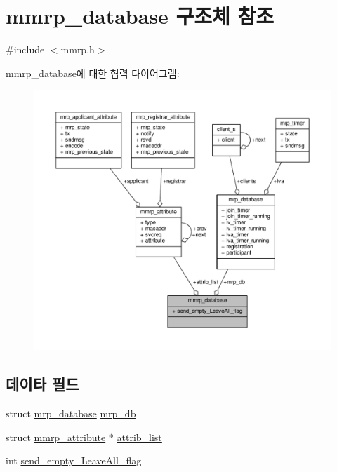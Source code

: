 \hypertarget{structmmrp__database}{}\section{mmrp\+\_\+database 구조체 참조}
\label{structmmrp__database}


{\ttfamily \#include $<$mmrp.\+h$>$}



mmrp\+\_\+database에 대한 협력 다이어그램\+:
\nopagebreak
\begin{figure}[H]
\begin{center}
\leavevmode
\includegraphics[width=350pt]{structmmrp__database__coll__graph}
\end{center}
\end{figure}
\subsection*{데이타 필드}
\begin{DoxyCompactItemize}
\item 
struct \hyperlink{structmrp__database}{mrp\+\_\+database} \hyperlink{structmmrp__database_a7e08db3b85c932325ce3a3605a09ab0c}{mrp\+\_\+db}
\item 
struct \hyperlink{structmmrp__attribute}{mmrp\+\_\+attribute} $\ast$ \hyperlink{structmmrp__database_aa65ffa246b17a8932ec564602195a338}{attrib\+\_\+list}
\item 
int \hyperlink{structmmrp__database_a5c551b6ff3976e96ec18e69b0706a532}{send\+\_\+empty\+\_\+\+Leave\+All\+\_\+flag}
\end{DoxyCompactItemize}


